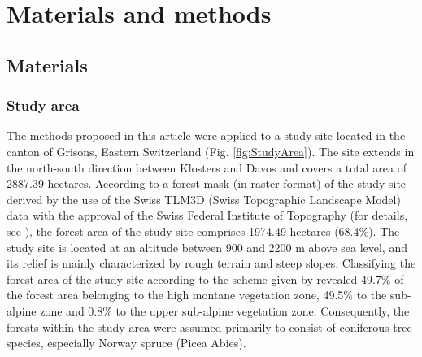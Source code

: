 
\section{Materials and methods}
\label{sec:Meth}



\subsection{Materials}
\label{sec:mat}

\subsubsection{Study area}
\label{sec:studarea}

The methods proposed in this article were applied to a study site located in the canton of Grisons, Eastern Switzerland (Fig. \ref{fig:StudyArea}). The site extends in the north-south direction between Klosters and Davos and covers a total area of 2887.39 hectares. According to a forest mask (in raster format) of the study site derived by the use of the Swiss TLM3D (Swiss Topographic Landscape Model) data with the approval of the Swiss Federal Institute of Topography (for details, see \citet{hill2013}), the forest area of the study site comprises 1974.49 hectares (68.4\%). The study site is located at an altitude between 900 and 2200 m above sea level, and its relief is mainly characterized by rough terrain and steep slopes. Classifying the forest area of the study site according to the scheme given by \citet{ott1997} revealed 49.7\% of the forest area belonging to the high montane vegetation  zone, 49.5\% to the sub-alpine zone and 0.8\% to the upper sub-alpine vegetation zone. Consequently, the forests within the study area were assumed primarily to consist of coniferous tree species, especially Norway spruce (Picea Abies).

